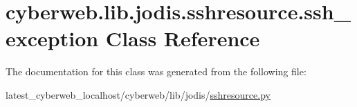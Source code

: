 \hypertarget{classcyberweb_1_1lib_1_1jodis_1_1sshresource_1_1ssh__exception}{\section{cyberweb.\-lib.\-jodis.\-sshresource.\-ssh\-\_\-exception \-Class \-Reference}
\label{classcyberweb_1_1lib_1_1jodis_1_1sshresource_1_1ssh__exception}
}


\-The documentation for this class was generated from the following file\-:\begin{DoxyCompactItemize}
\item 
latest\-\_\-cyberweb\-\_\-localhost/cyberweb/lib/jodis/\hyperlink{sshresource_8py}{sshresource.\-py}\end{DoxyCompactItemize}
